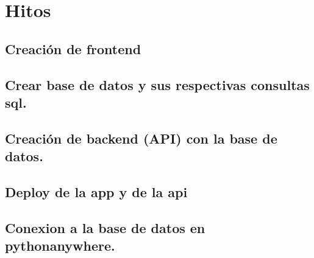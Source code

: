 \section{Hitos}

\subsection{Creación de frontend}

\subsection{Crear base de datos y sus respectivas consultas sql.}

\subsection{Creación de backend (API) con la base de datos.}

\subsection{Deploy de la app y de la api}

\subsection{Conexion a la base de datos en pythonanywhere.}
